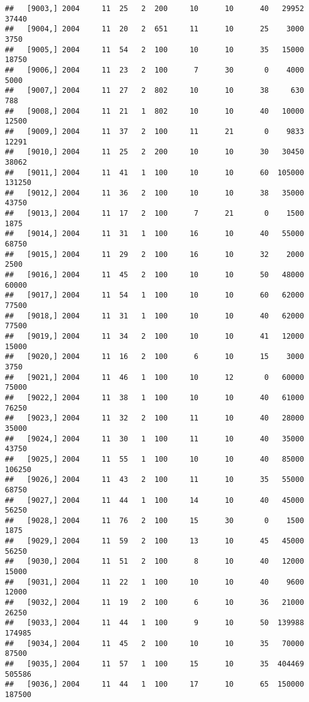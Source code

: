 \documentclass{article}\usepackage[]{graphicx}\usepackage[]{color}
\makeatletter
\newenvironment{kframe}{%
 \def\at@end@of@kframe{}%
 \ifinner\ifhmode%
  \def\at@end@of@kframe{\end{minipage}}%
  \begin{minipage}{\columnwidth}%
 \fi\fi%
 \def\FrameCommand##1{\hskip\@totalleftmargin \hskip-\fboxsep
 \colorbox{shadecolor}{##1}\hskip-\fboxsep
     \hskip-\linewidth \hskip-\@totalleftmargin \hskip\columnwidth}%
 \MakeFramed {\advance\hsize-\width
   \@totalleftmargin\z@ \linewidth\hsize
   \@setminipage}}%
 {\par\unskip\endMakeFramed%
 \at@end@of@kframe}
\newenvironment{knitrout}{}{} %
\makeatother
\begin{document}
\begin{knitrout}
\begin{kframe}
\begin{verbatim}
##   [9003,] 2004     11  25   2  200     10      10      40   29952   37440
##   [9004,] 2004     11  20   2  651     11      10      25    3000    3750
##   [9005,] 2004     11  54   2  100     10      10      35   15000   18750
##   [9006,] 2004     11  23   2  100      7      30       0    4000    5000
##   [9007,] 2004     11  27   2  802     10      10      38     630     788
##   [9008,] 2004     11  21   1  802     10      10      40   10000   12500
##   [9009,] 2004     11  37   2  100     11      21       0    9833   12291
##   [9010,] 2004     11  25   2  200     10      10      30   30450   38062
##   [9011,] 2004     11  41   1  100     10      10      60  105000  131250
##   [9012,] 2004     11  36   2  100     10      10      38   35000   43750
##   [9013,] 2004     11  17   2  100      7      21       0    1500    1875
##   [9014,] 2004     11  31   1  100     16      10      40   55000   68750
##   [9015,] 2004     11  29   2  100     16      10      32    2000    2500
##   [9016,] 2004     11  45   2  100     10      10      50   48000   60000
##   [9017,] 2004     11  54   1  100     10      10      60   62000   77500
##   [9018,] 2004     11  31   1  100     10      10      40   62000   77500
##   [9019,] 2004     11  34   2  100     10      10      41   12000   15000
##   [9020,] 2004     11  16   2  100      6      10      15    3000    3750
##   [9021,] 2004     11  46   1  100     10      12       0   60000   75000
##   [9022,] 2004     11  38   1  100     10      10      40   61000   76250
##   [9023,] 2004     11  32   2  100     11      10      40   28000   35000
##   [9024,] 2004     11  30   1  100     11      10      40   35000   43750
##   [9025,] 2004     11  55   1  100     10      10      40   85000  106250
##   [9026,] 2004     11  43   2  100     11      10      35   55000   68750
##   [9027,] 2004     11  44   1  100     14      10      40   45000   56250
##   [9028,] 2004     11  76   2  100     15      30       0    1500    1875
##   [9029,] 2004     11  59   2  100     13      10      45   45000   56250
##   [9030,] 2004     11  51   2  100      8      10      40   12000   15000
##   [9031,] 2004     11  22   1  100     10      10      40    9600   12000
##   [9032,] 2004     11  19   2  100      6      10      36   21000   26250
##   [9033,] 2004     11  44   1  100      9      10      50  139988  174985
##   [9034,] 2004     11  45   2  100     10      10      35   70000   87500
##   [9035,] 2004     11  57   1  100     15      10      35  404469  505586
##   [9036,] 2004     11  44   1  100     17      10      65  150000  187500

\end{verbatim}
\end{kframe}
\end{knitrout}
\end{document}
